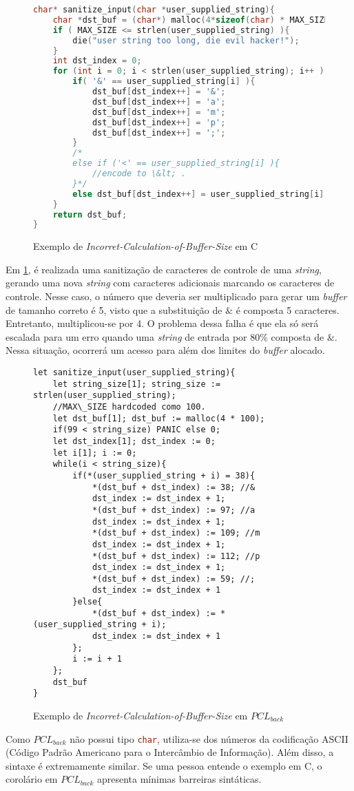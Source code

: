 \begin{figure}[ht]
	\caption{Exemplo de \emph{Incorret-Calculation-of-Buffer-Size} em C}
	\label{lst:c:spacial}
	\begin{lstlisting}[language=C]
char* sanitize_input(char *user_supplied_string){
	char *dst_buf = (char*) malloc(4*sizeof(char) * MAX_SIZE);  
	if ( MAX_SIZE <= strlen(user_supplied_string) ){
		die("user string too long, die evil hacker!");
	}  
	int dst_index = 0;  
	for (int i = 0; i < strlen(user_supplied_string); i++ ){
		if( '&' == user_supplied_string[i] ){
			dst_buf[dst_index++] = '&';  
			dst_buf[dst_index++] = 'a';  
			dst_buf[dst_index++] = 'm';  
			dst_buf[dst_index++] = 'p';  
			dst_buf[dst_index++] = ';';
		}
		/*  
		else if ('<' == user_supplied_string[i] ){
			//encode to \&lt; .
		}*/  
		else dst_buf[dst_index++] = user_supplied_string[i];
	}  
	return dst_buf;
}
	\end{lstlisting}
\end{figure}
\FloatBarrier

Em \ref{lst:c:spacial}, é realizada uma sanitização de caracteres de controle de uma \emph{string}, gerando uma nova \emph{string} com caracteres adicionais marcando os caracteres de controle. Nesse caso, o número que deveria ser multiplicado para gerar um \emph{buffer} de tamanho correto é 5, visto que a substituição de $\&$ é composta 5 caracteres. Entretanto, multiplicou-se por 4. O problema dessa falha é que ela só será escalada para um erro quando uma \emph{string} de entrada por $80\%$ composta de $\&$. Nessa situação, ocorrerá um acesso para além dos limites do \emph{buffer} alocado.

\begin{figure}[ht]
	\caption{Exemplo de \emph{Incorret-Calculation-of-Buffer-Size} em $PCL_{back}$}
	\label{lst:pclback:spacial}
	\begin{lstlisting}[language=PCLback]
let sanitize_input(user_supplied_string){
	let string_size[1]; string_size := strlen(user_supplied_string);
	//MAX\_SIZE hardcoded como 100.
	let dst_buf[1]; dst_buf := malloc(4 * 100); 
	if(99 < string_size) PANIC else 0;
	let dst_index[1]; dst_index := 0;
	let i[1]; i := 0;
	while(i < string_size){
		if(*(user_supplied_string + i) = 38){
			*(dst_buf + dst_index) := 38; //&
			dst_index := dst_index + 1;
			*(dst_buf + dst_index) := 97; //a
			dst_index := dst_index + 1;
			*(dst_buf + dst_index) := 109; //m
			dst_index := dst_index + 1;
			*(dst_buf + dst_index) := 112; //p
			dst_index := dst_index + 1;
			*(dst_buf + dst_index) := 59; //;
			dst_index := dst_index + 1
		}else{
			*(dst_buf + dst_index) := *(user_supplied_string + i);
			dst_index := dst_index + 1
		};
		i := i + 1
	};
	dst_buf
}
	\end{lstlisting}
\end{figure}
\FloatBarrier

Como $PCL_{back}$ não possui tipo \lstinline[language=C]|char|, utiliza-se dos números da codificação ASCII (Código Padrão Americano para o Intercâmbio de Informação). Além disso, a sintaxe é extremamente similar. Se uma pessoa entende o exemplo em C, o corolário em $PCL_{back}$ apresenta mínimas barreiras sintáticas.


